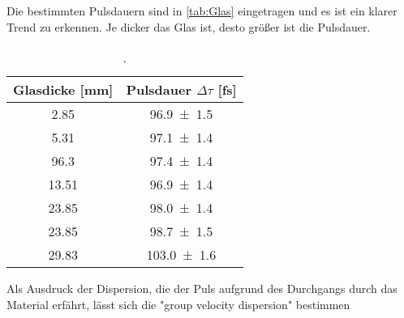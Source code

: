     Die bestimmten Pulsdauern sind in \autoref{tab:Glas} eingetragen und es ist ein klarer Trend zu erkennen.
    Je dicker das Glas ist, desto größer ist die Pulsdauer.
    \begin{table}[h]
        \centering
        \caption{.}
        \label{tab:Glas}
        \begin{tabular}{c c}
        \toprule
        {Glasdicke [mm]} & {Pulsdauer $\Delta \tau$ [fs]}  \\
        \midrule
        \num{2.85}     &   \num{96,9\pm1,5}  \\
        \num{5.31}     &   \num{97,1\pm1,4}  \\
        \num{96,3}     &   \num{97,4\pm1,4}  \\
        \num{13,51}    &   \num{96,9\pm1,4}  \\
        \num{23,85}    &   \num{98,0\pm1,4}  \\
        \num{23,85}    &   \num{98,7\pm1,5}  \\
        \num{29,83}    &   \num{103,0\pm1,6} \\
        \bottomrule
        \end{tabular}
    \end{table}
    Als Ausdruck der Dispersion, die der Puls aufgrund des Durchgangs durch das Material erfährt, lässt sich die "group velocity dispersion" bestimmen





